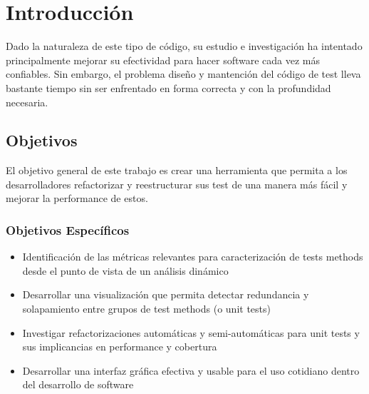 \chapter{Introducción} 
\par 
Dado la naturaleza de este tipo de código, su estudio e investigación ha intentado principalmente mejorar su efectividad para hacer software cada vez más confiables. Sin embargo, el problema diseño y mantención del código de test lleva bastante tiempo sin ser enfrentado en forma correcta y con la profundidad necesaria. 







\section{Objetivos}
\par El objetivo general de este trabajo es crear una herramienta que permita a los desarrolladores refactorizar y reestructurar sus test de una manera más fácil y mejorar la performance de estos.

\subsection*{Objetivos Específicos}
\begin{itemize}
\item Identificación de las métricas relevantes para caracterización de tests methods desde el punto de vista de un análisis dinámico
\item Desarrollar una visualización que permita detectar redundancia y solapamiento entre grupos de test methods (o unit tests)
\item Investigar refactorizaciones automáticas y semi-automáticas para unit tests y sus implicancias en performance y cobertura
\item Desarrollar una interfaz gráfica efectiva y usable para el uso cotidiano dentro del desarrollo de software
\end{itemize}

